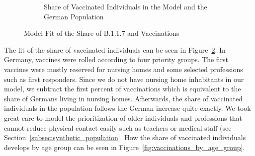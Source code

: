 \begin{figure}[ht]
\begin{subfigure}[b]{0.425\textwidth}
    \caption{Share of Vaccinated Individuals in the Model and the German Population}
    \label{fig:fit_vaccinations}
  \end{subfigure}
  \caption{Model Fit of the Share of B.1.1.7 and Vaccinations}
\end{figure}

The fit of the share of vaccinated individuals can be seen in
Figure~\ref{fig:fit_vaccinations}. In Germany, vaccines were rolled according to four
priority groups. The first vaccines were mostly reserved for nursing homes and some
selected professions such as first responders. Since we do not have nursing home
inhabitants in our model, we subtract the first percent of vaccinations which is
equivalent to the share of Germans living in nursing homes. Afterwards, the share of
vaccinated individuals in the population follows the German increase quite exactly. We
took great care to model the prioritization of older individuals and professions that
cannot reduce physical contact easily such as teachers or medical staff (see
Section~\ref{subsec:synthetic_population}. How the share of vaccinated individuals
develops by age group can be seen in Figure~\ref{fig:vaccinations_by_age_group}.

\FloatBarrier

